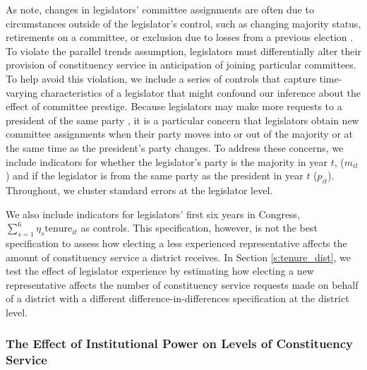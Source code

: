 \documentclass[12pt]{article}
\begin{document}
As \cite{BerryFowler2016} note, changes in legislators' committee assignments are often due to circumstances outside of the legislator's control, such as changing majority status, retirements on a committee, or exclusion due to losses from a previous election \citep{GrimmerPowell2013}. To violate the parallel trends assumption,  legislators must differentially alter their provision of constituency service in anticipation of joining particular committees. To help avoid this violation, we include a series of controls that capture time-varying characteristics of a legislator that might confound our inference about the effect of committee prestige. Because legislators may make more requests to a president of the same party \citep{BerryBurdenHowell09}, it is a particular concern that legislators obtain new committee assignments when their party moves into or out of the majority or at the same time as the president's party changes. To address these concerns, we include indicators for whether the legislator's party is the majority in year $t$, ($m_{it}$) and if the legislator is from the same party as the president in year $t$ ($p_{it}$). Throughout, we cluster standard errors at the legislator level.

We also include indicators for legislators' first six years in Congress, $ \sum_{s = 1}^{6} \eta_{s} \text{tenure}_{it}$ as controls.
This specification, however, is not the best specification to assess how electing a less experienced representative affects the amount of constituency service a district receives. In Section \ref{s:tenure_dist}, we test the effect of legislator experience by estimating how electing a new representative affects the number of constituency service requests made on behalf of a district with a different difference-in-differences specification at the district level.   



\subsubsection{The Effect of Institutional Power on Levels of Constituency Service}\label{s:prestigeresults}
\end{document}
